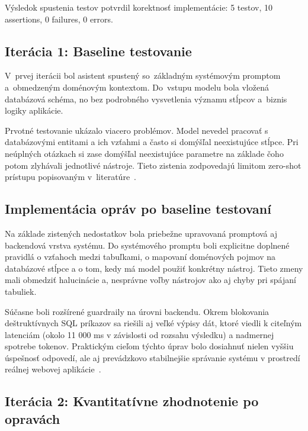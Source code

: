 Výsledok spustenia testov potvrdil korektnosť implementácie: 5 testov, 10
assertions, 0 failures, 0 errors.

\subsection{Iterácia 1: Baseline testovanie}

V~prvej iterácii bol asistent spustený so~základným systémovým promptom a~obmedzeným
doménovým kontextom. Do~vstupu modelu bola vložená databázová schéma, no bez podrobného
vysvetlenia významu stĺpcov a~biznis logiky aplikácie.

Prvotné testovanie ukázalo viacero problémov. Model nevedel pracovať s
databázovými entitami a ich vzťahmi a často si domýšľal neexistujúce stĺpce. Pri neúplných
otázkach si zase domýšľal neexistujúce parametre na základe čoho potom zlyhávali jednotlivé
nástroje. Tieto zistenia zodpovedajú limitom zero-shot prístupu popisovaným v~literatúre~\cite{zhao2023,
atkinson2025}.

\subsection{Implementácia opráv po baseline testovaní}

Na základe zistených nedostatkov bola priebežne upravovaná promptová aj backendová
vrstva systému. Do systémového promptu boli explicitne doplnené pravidlá o
vzťahoch medzi tabuľkami, o mapovaní doménových pojmov na databázové stĺpce a o tom,
kedy má model použiť konkrétny nástroj. Tieto zmeny mali obmedziť halucinácie a,
nesprávne voľby nástrojov ako aj chyby pri spájaní tabuliek.

Súčasne boli rozšírené guardraily na úrovni backendu. Okrem blokovania deštruktívnych
SQL príkazov sa riešili aj veľké výpisy dát, ktoré viedli k citeľným latenciám (okolo
11 000 ms v závislosti od rozsahu výsledku) a nadmernej spotrebe tokenov. Praktickým
cieľom týchto úprav bolo dosiahnuť nielen vyššiu úspešnosť odpovedí, ale aj
prevádzkovo stabilnejšie správanie systému v prostredí reálnej webovej aplikácie~\cite{ruby2025}.

\subsection{Iterácia 2: Kvantitatívne zhodnotenie po opravách}

